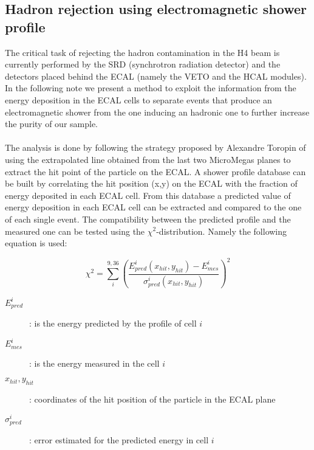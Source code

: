 \subsection{Hadron rejection using electromagnetic shower profile}
\label{chapter3:sec:bkg-ecal-profile}

The critical task of rejecting the hadron contamination in the H4 beam
is currently performed by the SRD (synchrotron radiation detector) and
the detectors placed behind the ECAL (namely the VETO and the HCAL
modules). In the following note we present a method to exploit the
information from the energy deposition in the ECAL cells to separate
events that produce an electromagnetic shower from the one inducing an
hadronic one to further increase the purity of our sample.
\\
\\
The analysis is done by following the strategy proposed by Alexandre
Toropin of using the extrapolated line obtained from the last two
MicroMegas planes to extract the hit point of the particle on the
ECAL. A shower profile database can be built by correlating the hit
position (x,y) on the ECAL with the fraction of energy deposited in
each ECAL cell. From this database a predicted value of energy
deposition in each ECAL cell can be extracted and compared to the one
of each single event. The compatibility between the predicted profile
and the measured one can be tested using the
$\chi^2$-distribution. Namely the following equation is used:

\begin{equation}
  \chi^2 = \sum^{9,36}_i \left(\frac{E_{pred}^i(x_{hit},y_{hit})-E_{mes}^i}{\sigma^{i}_{pred}(x_{hit},y_{hit})}\right)^2
  \label{eqn:chi}
\end{equation}


\begin{description}
\item[$E_{pred}^i$]: is the energy predicted by the profile of cell
  $i$
\item[$E_{mes}^i$]: is the energy measured in the cell $i$
\item[$x_{hit},y_{hit}$]: coordinates of the hit position of the
  particle in the ECAL plane
\item [$\sigma^{i}_{pred}$]: error estimated for the predicted energy
  in cell $i$
\end{description}


